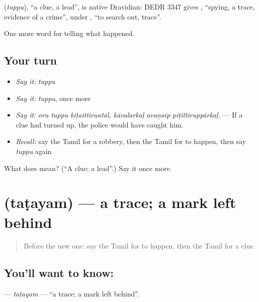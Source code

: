\begin{cousinweb}
\textbf{} (\emph{tuppu}), \textquotedblleft{}a clue, a lead\textquotedblright{}, is native Dravidian: DEDR 3347 gives , \textquotedblleft{}spying, a trace, evidence of a crime\textquotedblright{}, under , \textquotedblleft{}to search out, trace\textquotedblright{}.
\end{cousinweb}

\begin{grammarlens}[title={What you've built}]
One more word for telling what happened.
\end{grammarlens}

\subsection*{Your turn}
\begin{itemize}
\raggedright
  \item \emph{Say it:} \emph{tuppu}
  \item \emph{Say it:} \emph{tuppu}, once more
  \item \emph{Say it:} \emph{oru tuppu kiṭaittiruntāl, kāvalarkaḷ avaṉaip piṭittiruppārkaḷ.} — If a clue had turned up, the police would have caught him.
  \item \emph{Recall:} say the Tamil for a robbery, then the Tamil for to happen, then say \emph{tuppu} again
\end{itemize}

\begin{tcolorbox}[breakable,colback=teal!4,colframe=teal!35!black,title={Before you move on}]
What does  mean? (\textquotedblleft{}A clue; a lead\textquotedblright{}.) Say it once more.
\end{tcolorbox}
\section[\texorpdfstring{\ta{தடயம்} (taṭayam)}{தடயம் (taṭayam)}]{ (taṭayam) — a trace; a mark left behind}

\label{lesson:TA-C295-tatayam}



\begin{quote}
Before the new one: say the Tamil for to happen, then the Tamil for a clue.
\end{quote}

\subsection*{You'll want to know: }
\textbf{} — \emph{taṭayam} — \textquotedblleft{}a trace; a mark left behind\textquotedblright{}.

